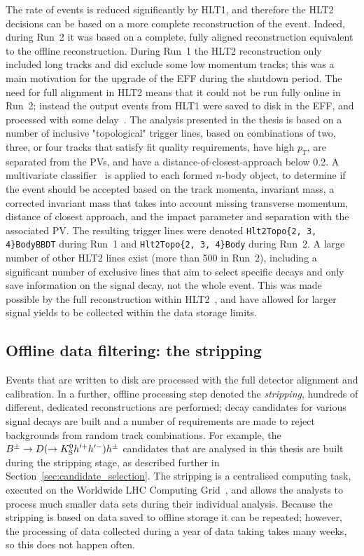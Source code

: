 The rate of events is reduced significantly by HLT1, and therefore the HLT2 decisions can be based on a more complete reconstruction of the event. Indeed, during Run~2 it was based on a complete, fully aligned reconstruction equivalent to the offline reconstruction. During Run~1 the HLT2 reconstruction only included long tracks and did exclude some low momentum tracks; this was a main motivation for the upgrade of the EFF during the shutdown period. The need for full alignment in HLT2 means that it could not be run fully online in Run~2; instead the output events from HLT1 were saved to disk in the EFF, and processed with some delay~\cite{Trigger-Performance2}. The analysis presented in the thesis is based on a number of inclusive "topological" trigger lines, based on combinations of two, three, or four tracks that satisfy fit quality requirements, have high $p_T$, are separated from the PVs, and have a distance-of-closest-approach below 0.2\mm. A multivariate classifier~\cite{gligorovEfficientReliableFast2013} is applied to each formed $n$-body object, to determine if the event should be accepted based on the track momenta, invariant mass, a corrected invariant mass that takes into account missing transverse momentum, distance of closest approach, and the impact parameter and separation with the associated PV. The resulting trigger lines were denoted \texttt{Hlt2Topo\{2, 3, 4\}BodyBBDT} during Run~1 and \texttt{Hlt2Topo\{2, 3, 4\}Body} during Run~2.  A large number of other HLT2 lines exist (more than 500 in Run~2), including a significant number of exclusive lines that aim to select specific decays and only save information on the signal decay, not the whole event. This was made possible by the full reconstruction within HLT2~\cite{Trigger-Performance2}, and have allowed for larger signal yields to be collected within the data storage limits.


\subsection{Offline data filtering: the \lhcb stripping} %
\label{sub:offline_data_filtering_the_lhcb_stripping}

Events that are written to disk are processed with the full detector alignment and calibration. In a further, offline processing step denoted the \emph{stripping}, hundreds of different, dedicated reconstructions are performed; decay candidates for various signal decays are built and a number of requirements are made to reject backgrounds from random track combinations. For example, the ${{B}^\pm}\rightarrow{\ensuremath{D}}(\rightarrow{\ensuremath{{K}^0_{\mathrm{S}}}} h'^+h'^-)h^\pm$ candidates that are analysed in this thesis are built during the stripping stage, as described further in Section~\ref{sec:candidate_selection}. The stripping is a centralised computing task, executed on the Worldwide LHC Computing Grid~\cite{birdComputingLargeHadron2011a}, and allows the analysts to process much smaller data sets during their individual analysis. Because the stripping is based on data saved to offline storage it can be repeated; however, the processing of data collected during a year of data taking takes many weeks, so this does not happen often.

